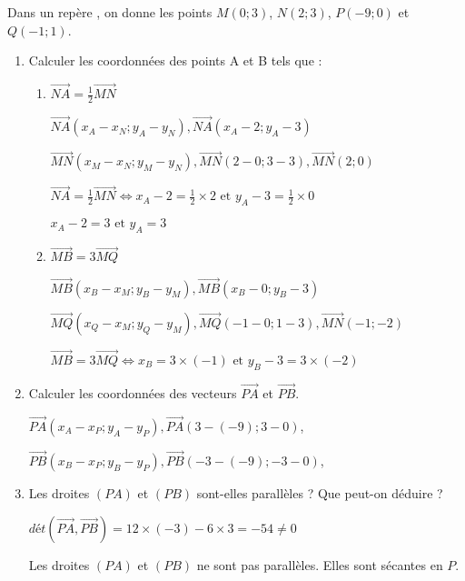 
Dans un repère \Oij, on donne les points $M(0;3)$, $N(2;3)$, $P(-9;0)$ et $Q(-1;1)$.
\begin{enumerate}
\item Calculer les coordonnées des points A et B tels que :
 \begin{enumerate}
\item $\overrightarrow{NA}=\frac{1}{2}\overrightarrow{MN}$


$\overrightarrow{NA}(x_A-x_N;y_A-y_N), \overrightarrow{NA}(x_A-2;y_A-3)$

$\overrightarrow{MN}(x_M-x_N;y_M-y_N), \overrightarrow{MN}(2-0;3-3), \overrightarrow{MN}(2;0)$

$\overrightarrow{NA}=\frac{1}{2}\overrightarrow{MN} \Longleftrightarrow  x_A-2 =\frac{1}{2} \times 2 \text{ et } y_A-3 = \frac{1}{2} \times 0 $

$x_A-2 =3 \text{ et } y_A  = 3$  

\item $\overrightarrow{MB}=3\overrightarrow{MQ}$


$\overrightarrow{MB}(x_B-x_M;y_B-y_M), \overrightarrow{MB}(x_B-0;y_B-3)$

$\overrightarrow{MQ}(x_Q-x_M;y_Q-y_M), \overrightarrow{MQ}(-1-0;1-3), \overrightarrow{MN}(-1;-2)$

$\overrightarrow{MB}=3\overrightarrow{MQ} \Longleftrightarrow  x_B =3 \times (-1) \text{ et } y_B-3 =3\times (-2) $


\end{enumerate}
\item Calculer les coordonnées des vecteurs $\overrightarrow{PA}$ et $\overrightarrow{PB}$.


$\overrightarrow{PA}(x_A-x_P;y_A-y_P), \overrightarrow{PA}(3-(-9);3-0)$,  


$\overrightarrow{PB}(x_B-x_P;y_B-y_P), \overrightarrow{PB}(-3-(-9);-3-0)$,  

\item Les droites $(PA)$ et $(PB)$ sont-elles parallèles ? Que peut-on déduire ?

$dét(\overrightarrow{PA}, \overrightarrow{PB}) = 12 \times (-3) - 6 \times 3 = -54 \neq 0$

Les droites $(PA)$ et $(PB)$ ne sont pas parallèles. Elles sont sécantes en $P$.



\end{enumerate}
